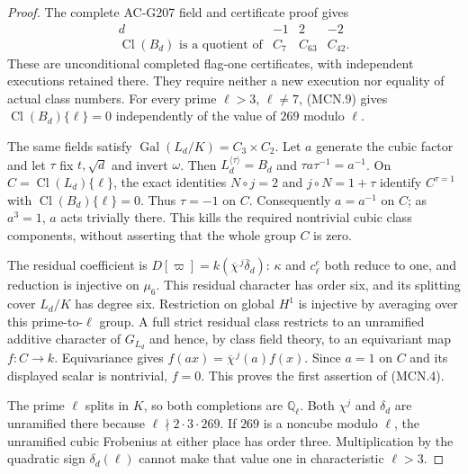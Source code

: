 \begin{proof}
The complete AC-G207 field and certificate proof gives
\[
 \begin{array}{c|ccc}
 d&-1&2&-2\\\hline
 \operatorname{Cl}(B_d)\text{ is a quotient of}&C_7&C_{63}&C_{42}.
 \end{array}
 \tag{MCN.9}
\]
These are unconditional completed flag-one certificates,
with independent executions retained there.  They require
neither a new execution nor equality of actual class numbers.
For every prime $\ell>3$, $\ell\ne7$, (MCN.9) gives
$\operatorname{Cl}(B_d)\{\ell\}=0$ independently of the
value of $269$ modulo $\ell$.

The same fields satisfy $\operatorname{Gal}(L_d/K)=C_3\times C_2$.
Let $a$ generate the cubic factor and let $\tau$ fix $t,\sqrt d$
and invert $\omega$.  Then $L_d^{\langle\tau\rangle}=B_d$
and $\tau a\tau^{-1}=a^{-1}$.
On $C=\operatorname{Cl}(L_d)\{\ell\}$, the exact identities
$N\circ j=2$ and $j\circ N=1+\tau$ identify
$C^{\tau=1}$ with $\operatorname{Cl}(B_d)\{\ell\}=0$.
Thus $\tau=-1$ on $C$.  Consequently $a=a^{-1}$ on $C$;
as $a^3=1$, $a$ acts trivially there.
This kills the required nontrivial cubic class components,
without asserting that the whole group $C$ is zero.

The residual coefficient is
$D[\varpi]=k(\overline\chi^{\,j}\overline\delta_d)$:
$\kappa$ and $c_\ell^e$ both reduce to one, and reduction
is injective on $\mu_6$.  This residual character has order
six, and its splitting cover $L_d/K$ has degree six.
Restriction on global $H^1$ is injective by averaging over
this prime-to-$\ell$ group.  A full strict residual class
restricts to an unramified additive character of $G_{L_d}$
and hence, by class field theory, to an equivariant map
$f:C\to k$.  Equivariance gives
$f(ax)=\overline\chi^{\,j}(a)f(x)$.
Since $a=1$ on $C$ and its displayed scalar is nontrivial,
$f=0$.  This proves the first assertion of (MCN.4).

The prime $\ell$ splits in $K$, so both completions are
$\mathbb Q_\ell$.  Both $\chi^j$ and $\delta_d$ are
unramified there because $\ell\nmid2\cdot3\cdot269$.
If $269$ is a noncube modulo $\ell$, the unramified cubic
Frobenius at either place has order three.  Multiplication
by the quadratic sign $\delta_d(\ell)$ cannot make that
value one in characteristic $\ell>3$.


\end{proof}
